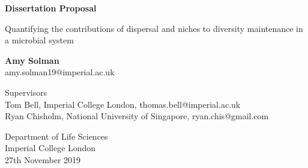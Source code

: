 \begin{titlepage}
   \begin{center}
       \vspace*{1cm}
 	\Huge
       \textbf{Dissertation Proposal}
 
       \vspace{0.5cm}
       \Huge
        Quantifying the contributions of dispersal and niches to diversity maintenance in a microbial system
 
       \vspace{1.5cm}
 	\huge
       \textbf{Amy Solman} \\
       amy.solman19@imperial.ac.uk
 
       \vfill
       \Large
 	Supervisors\\
         Tom Bell, Imperial College London, thomas.bell@imperial.ac.uk \\
        Ryan Chisholm, National University of Singapore, ryan.chis@gmail.com 
 
       \vspace{0.8cm}
 

 	\Large
       Department of Life Sciences\\
       Imperial College London\\
       27th November 2019
 
   \end{center}
\end{titlepage}